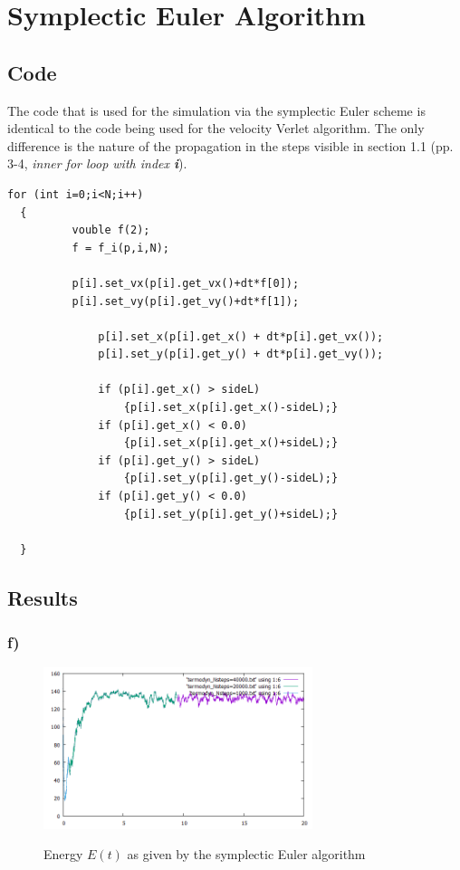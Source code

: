 \documentclass[12pt,a4paper]{article}	%
\newcommand{\x}{\textbf}
\begin{document}
\newpage

\section{Symplectic Euler Algorithm}

\subsection{Code}

The code that is used for the simulation via the symplectic Euler scheme is identical to the code being used for the velocity Verlet algorithm. The only difference is the nature of the propagation in the steps visible in section 1.1 (pp. 3-4, \textit{inner for loop with index \x{i}}).
\begin{lstlisting}[frame=single]  
for (int i=0;i<N;i++)
  {
	      vouble f(2);
	      f = f_i(p,i,N);
		              
	      p[i].set_vx(p[i].get_vx()+dt*f[0]);
	      p[i].set_vy(p[i].get_vy()+dt*f[1]);

              p[i].set_x(p[i].get_x() + dt*p[i].get_vx());
              p[i].set_y(p[i].get_y() + dt*p[i].get_vy());

    	      if (p[i].get_x() > sideL) 
    	          {p[i].set_x(p[i].get_x()-sideL);}
 	          if (p[i].get_x() < 0.0) 
 	              {p[i].set_x(p[i].get_x()+sideL);}
    	      if (p[i].get_y() > sideL) 
    	          {p[i].set_y(p[i].get_y()-sideL);}
 	          if (p[i].get_y() < 0.0) 
 	              {p[i].set_y(p[i].get_y()+sideL);}

  }
\end{lstlisting}

\newpage

\subsection{Results}

\subsubsection*{f)}

\begin{figure}[h!]	
\centering
{\includegraphics[width=0.7\textwidth]{E(t).png}}		
\caption{Energy $E(t)$ as given by the symplectic Euler algorithm}
\end{figure}
\end{document}
